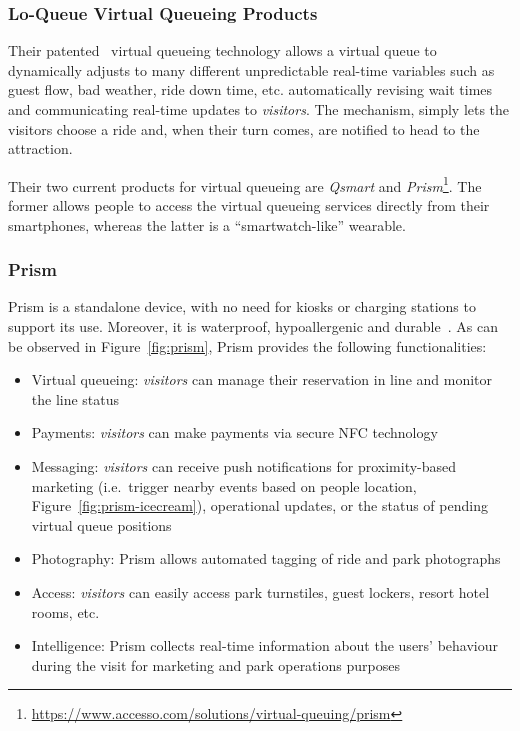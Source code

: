 \subsubsection{Lo-Queue Virtual Queueing Products}
Their patented~\cite{q-management-system-patent} \cite{q-system-patent}
virtual queueing technology allows a virtual queue to dynamically adjusts to many different unpredictable real-time variables such
as guest flow, bad weather, ride down time, etc.
automatically revising wait times and communicating real-time updates to \textit{visitors}.
The mechanism, simply lets the visitors choose a ride and, when their turn comes, are notified to head to the attraction.

Their two current products for virtual queueing are \textit{Qsmart} and \textit{Prism}\footnote{\url{https://www.accesso.com/solutions/virtual-queuing/prism}}.
The former allows people to access the virtual queueing services directly from their smartphones, whereas the latter is a ``smartwatch-like''
wearable.

\subsubsection*{Prism}
Prism is a standalone device, with no need for kiosks or charging stations to support its use.
Moreover, it is waterproof, hypoallergenic and durable~\cite{prism-desc}.
As can be observed in Figure~\ref{fig:prism}, Prism provides the following functionalities:
\begin{itemize}
    \item Virtual queueing: \textit{visitors} can manage their reservation in line and monitor the line status
    \item Payments: \textit{visitors} can make payments via secure NFC technology
    \item Messaging: \textit{visitors} can receive push notifications for proximity-based marketing (i.e.\ trigger nearby events based on people location, Figure~\ref{fig:prism-icecream}), operational updates, or the status of pending virtual queue positions
    \item Photography: Prism allows automated tagging of ride and park photographs
    \item Access: \textit{visitors} can easily access park turnstiles, guest lockers, resort hotel rooms, etc.
    \item Intelligence: Prism collects real-time information about the users' behaviour during the visit for marketing and park operations purposes
\end{itemize}

